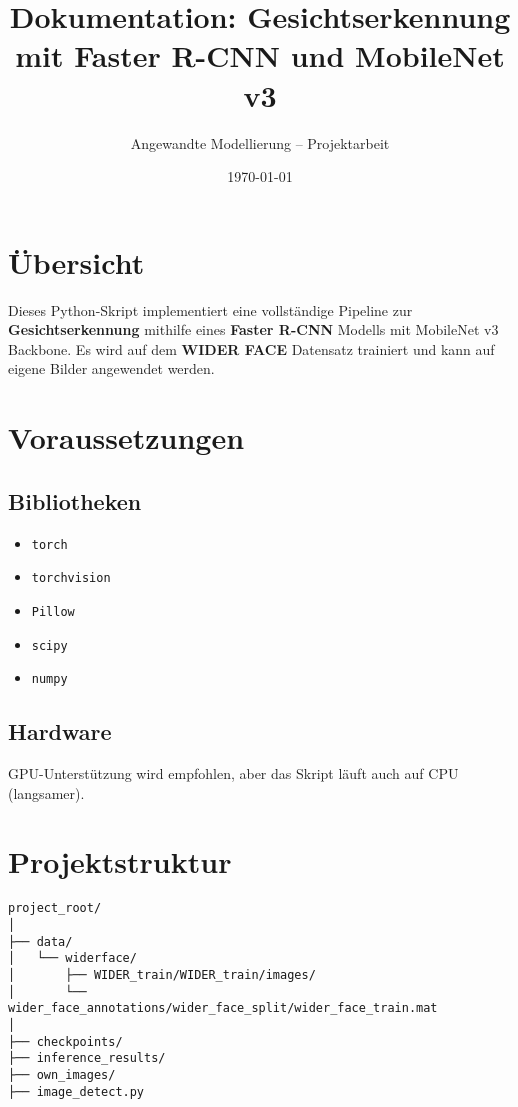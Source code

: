\documentclass[11pt,a4paper]{article}
\title{\textbf{Dokumentation: Gesichtserkennung mit Faster R-CNN und MobileNet v3}}
\author{Angewandte Modellierung – Projektarbeit}
\date{\today}
\begin{document}
\maketitle

\tableofcontents
\newpage

\section{Übersicht}

Dieses Python-Skript implementiert eine vollständige Pipeline zur \textbf{Gesichtserkennung} mithilfe eines \textbf{Faster R-CNN} Modells mit MobileNet v3 Backbone. Es wird auf dem \textbf{WIDER FACE} Datensatz trainiert und kann auf eigene Bilder angewendet werden.

\section{Voraussetzungen}

\subsection{Bibliotheken}
\begin{itemize}
    \item \texttt{torch}
    \item \texttt{torchvision}
    \item \texttt{Pillow}
    \item \texttt{scipy}
    \item \texttt{numpy}
\end{itemize}

\subsection{Hardware}
GPU-Unterstützung wird empfohlen, aber das Skript läuft auch auf CPU (langsamer).

\section{Projektstruktur}

\begin{verbatim}
project_root/
│
├── data/
│   └── widerface/
│       ├── WIDER_train/WIDER_train/images/
│       └── wider_face_annotations/wider_face_split/wider_face_train.mat
│
├── checkpoints/
├── inference_results/
├── own_images/
├── image_detect.py
\end{verbatim}
\end{document}
